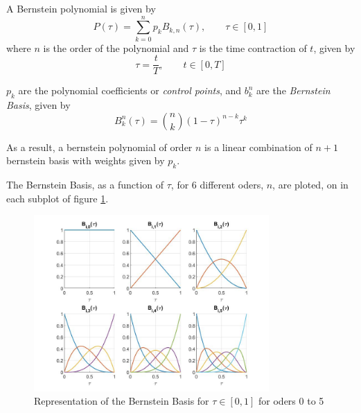 \par A Bernstein polynomial is given by %
\begin{equation}
    \label{eq:bern_pol}
    P(\tau) = \sum_{k=0}^n p_k B_{k,n} (\tau), \qquad \tau\in [0,1]
\end{equation}
where $n$ is the order of the polynomial and $\tau$ is the time contraction of $t$, given by 
\begin{equation}
    \tau = \frac{t}{T}, \qquad t\in [0,T]
    \label{eq:time_delay}
\end{equation}

\par $p_k$ are the polynomial coefficients or \textit{control points}, and $b_k^n$ are the \textit{Bernstein Basis}, given by 
\begin{equation}
	B^n_k {(\tau)} = \binom{n}{k} {(1 - \tau)}^{n-k} \tau^k
    \label{eq:bern_basis}
\end{equation}
\par As a result, a bernstein polynomial of order $n$ is a linear combination of $n+1$ bernstein basis with weights given by $p_k$.

\par The Bernstein Basis, as a function of $\tau$, for 6 different oders, $n$, are ploted, on in each subplot of figure \ref{fig:bernsteinbasis}.

\begin{figure}[h!]
\centering
\includegraphics[width=0.8\textwidth]{Images/bernstein_basis.jpg}
\caption{Representation of the Bernstein Basis for $\tau \in [0,1]$ for oders 0 to 5}
\label{fig:bernsteinbasis}
\end{figure}

